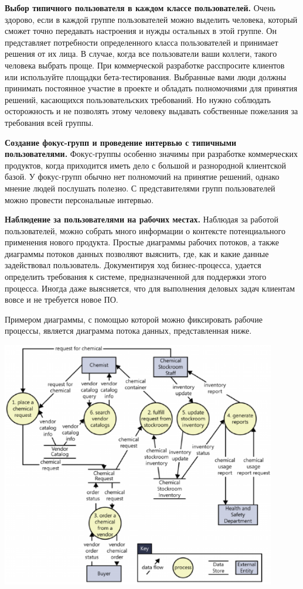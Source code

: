 \documentclass{../../text-style}
\begin{document}
\textbf{Выбор типичного пользователя в каждом классе пользователей.} Очень здорово, если в каждой группе пользователей можно выделить человека, который сможет точно передавать настроения и нужды остальных в этой группе. Он представляет потребности определенного класса пользователей и принимает решения от их лица. В случае, когда все пользователи ваши коллеги, такого человека выбрать проще. При коммерческой разработке расспросите клиентов или используйте площадки бета-тестирования. Выбранные вами люди должны принимать постоянное участие в проекте и обладать полномочиями для принятия решений, касающихся пользовательских требований. Но нужно соблюдать осторожность и не позволять этому человеку выдавать собственные пожелания за требования всей группы.

\textbf{Создание фокус-групп и проведение интервью с типичными пользователями.} Фокус-группы особенно значимы при разработке коммерческих продуктов, когда приходится иметь дело с большой и разнородной клиентской базой. У фокус-групп обычно нет полномочий на принятие решений, однако мнение людей послушать полезно. С представителями групп пользователей можно провести персональные интервью.

\textbf{Наблюдение за пользователями на рабочих местах.} Наблюдая за работой пользователей, можно собрать много информации о контексте потенциального применения нового продукта. Простые диаграммы рабочих потоков, а также диаграммы потоков данных позволяют выяснить, где, как и какие данные задействовал пользователь. Документируя ход бизнес-процесса, удается определить требования к системе, предназначенной для поддержки этого процесса. Иногда даже выясняется, что для выполнения деловых задач клиентам вовсе и не требуется новое ПО.

Примером диаграммы, с помощью которой можно фиксировать рабочие процессы, является диаграмма потока данных, представленная ниже.

\begin{center}
    \includegraphics[width=0.9\textwidth]{dfd.png}
\end{center}
\end{document}
